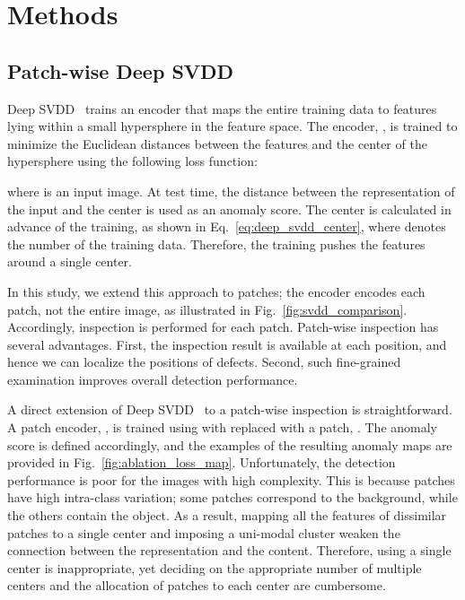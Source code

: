 \documentclass[runningheads]{llncs}
\begin{document}
 
\section{Methods}
\subsection{Patch-wise Deep SVDD} \label{sec:patch_svdd}

Deep SVDD~\cite{deepSVDD} trains an encoder that maps the entire training data to features lying within a small hypersphere in the feature space.
The encoder, , is trained to minimize the Euclidean distances between the features and the center of the hypersphere using the following loss function:


where  is an input image.
At test time, the distance between the representation of the input and the center is used as an anomaly score.
The center  is calculated in advance of the training, as shown in Eq.~\ref{eq:deep_svdd_center}, where  denotes the number of the training data.
Therefore, the training pushes the features around a single center.



In this study, we extend this approach to patches; the encoder encodes each patch, not the entire image, as illustrated in Fig.~\ref{fig:svdd_comparison}.
Accordingly, inspection is performed for each patch.
Patch-wise inspection has several advantages.
First, the inspection result is available at each position, and hence we can localize the positions of defects.
Second, such fine-grained examination improves overall detection performance.


A direct extension of Deep SVDD~\cite{deepSVDD} to a patch-wise inspection is straightforward.
A patch encoder, , is trained using  with  replaced with a patch, .
The anomaly score is defined accordingly, and the examples of the resulting anomaly maps are provided in Fig.~\ref{fig:ablation_loss_map}.
Unfortunately, the detection performance is poor for the images with high complexity.
This is because patches have high intra-class variation; some patches correspond to the background, while the others contain the object.
As a result, mapping all the features of dissimilar patches to a single center and imposing a uni-modal cluster weaken the connection between the representation and the content.
Therefore, using a single center  is inappropriate, yet deciding on the appropriate number of multiple centers and the allocation of patches to each center are cumbersome.
\end{document}
